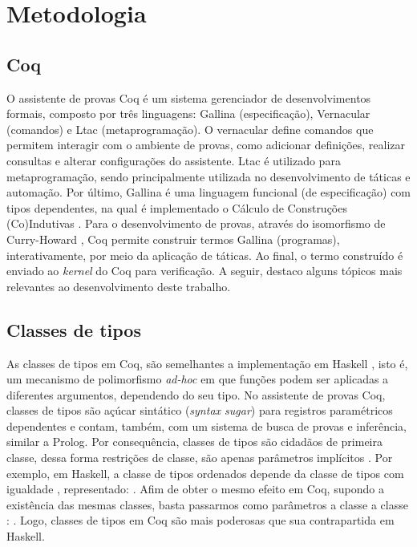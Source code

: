 \chapter{Metodologia}\label{chp:metodologia}

\section{Coq}
O assistente de provas Coq \cite{Coq2021} é um sistema gerenciador de desenvolvimentos formais, composto por três linguagens: Gallina (especificação), Vernacular (comandos) e Ltac (metaprogramação). O vernacular define comandos que permitem interagir com o ambiente de provas, como adicionar definições, realizar consultas e alterar configurações do assistente. Ltac é utilizado para metaprogramação, sendo principalmente utilizada no desenvolvimento de táticas e automação. Por último, Gallina é uma linguagem funcional (de especificação) com tipos dependentes, na qual é implementado o Cálculo de Construções (Co)Indutivas \cite{Coquand1988,Coquand1990,PaulinMohring1993}. Para o desenvolvimento de provas, através do isomorfismo de Curry-Howard \cite{Soerensen2006}, Coq permite construir termos Gallina (programas), interativamente, por meio da aplicação de táticas. Ao final, o termo construído é enviado ao \textit{kernel} do Coq para verificação. A seguir, destaco alguns tópicos mais relevantes ao desenvolvimento deste trabalho.

\section{Classes de tipos}\label{sec:classes}
As classes de tipos em Coq, são semelhantes a implementação em Haskell \cite{Hall1996}, isto é, um mecanismo de polimorfismo \textit{ad-hoc} \cite{Wadler1989} em que funções podem ser aplicadas a diferentes argumentos, dependendo do seu tipo. No assistente de provas Coq, classes de tipos são açúcar sintático (\textit{syntax sugar}) para registros paramétricos dependentes e
contam, também, com um sistema de busca de provas e inferência, similar a Prolog. Por consequência, classes de tipos são cidadãos de primeira classe, dessa forma restrições de classe, são apenas parâmetros implícitos \cite{Sozeau2008}. Por exemplo, em Haskell, a classe de tipos ordenados depende da classe de tipos com igualdade \cite{HaskellOrd}, representado: . Afim de obter o mesmo efeito em Coq, supondo a existência das mesmas classes, basta passarmos como parâmetros a classe  a classe : . Logo, classes de tipos em Coq são mais poderosas que sua contrapartida em Haskell. 

